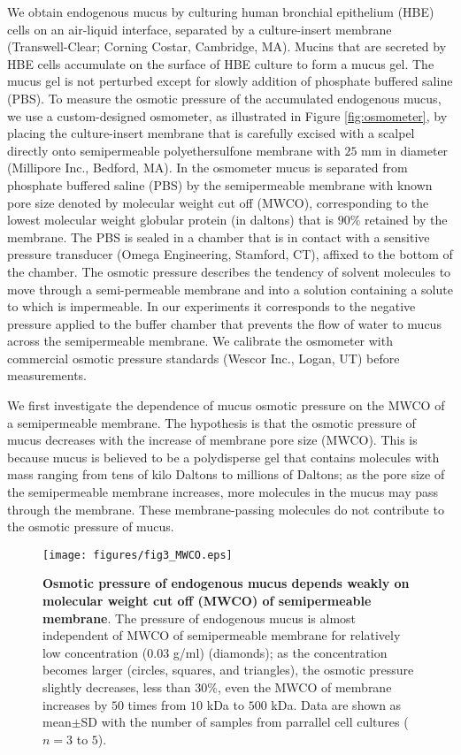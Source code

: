 \documentclass[8.5pt,twoside,twocolumn]{article}
\begin{document}
We obtain endogenous mucus by culturing human bronchial epithelium (HBE)
cells on an air-liquid interface\cite{Fulcher2005}, separated by a
culture-insert membrane (Transwell-Clear; Corning Costar, Cambridge, MA).
Mucins that are secreted by HBE cells accumulate on the surface of HBE
culture to form a mucus gel. The mucus gel is not perturbed except for
slowly addition of phosphate buffered saline (PBS). To measure the osmotic
pressure of the accumulated endogenous mucus, we use a custom-designed
osmometer, as illustrated in Figure \ref{fig:osmometer}, by placing the
culture-insert membrane that is carefully excised with a scalpel directly
onto semipermeable polyethersulfone membrane with $25$ mm in diameter
(Millipore Inc., Bedford, MA). In the osmometer mucus is separated from
phosphate buffered saline (PBS) by the semipermeable membrane with known
pore size denoted by molecular weight cut off (MWCO), corresponding to the
lowest molecular weight globular protein (in daltons) that is $90\%$
retained by the membrane. The PBS is sealed in a chamber that is in contact
with a sensitive pressure transducer (Omega Engineering, Stamford, CT),
affixed to the bottom of the chamber. The osmotic pressure describes the
tendency of solvent molecules to move through a semi-permeable membrane and
into a solution containing a solute to which is impermeable. In our
experiments it corresponds to the negative pressure applied to the buffer
chamber that prevents the flow of water to mucus across the semipermeable
membrane. We calibrate the osmometer with commercial osmotic pressure
standards (Wescor Inc., Logan, UT) before measurements.

We first investigate the dependence of mucus osmotic pressure on the MWCO of
a semipermeable membrane. The hypothesis is that the osmotic pressure of
mucus decreases with the increase of membrane pore size (MWCO). This is
because mucus is believed to be a polydisperse gel that contains molecules
with mass ranging from tens of kilo Daltons to millions of Daltons; as the
pore size of the semipermeable membrane increases, more molecules in the
mucus may pass through the membrane. These membrane-passing molecules do not
contribute to the osmotic pressure of mucus. 
\begin{figure}[h]
\centering
\texttt{[image: figures/fig3\_MWCO.eps]}
\caption{\textbf{Osmotic pressure of endogenous mucus depends weakly on
molecular weight cut off (MWCO) of semipermeable membrane}. The pressure of
endogenous mucus is almost independent of MWCO of semipermeable membrane for
relatively low concentration ($0.03$ g/ml) (diamonds); as the concentration
becomes larger (circles, squares, and triangles), the osmotic pressure
slightly decreases, less than $30\%$, even the MWCO of membrane increases by 
$50$ times from $10$ kDa to $500$ kDa. Data are shown as mean$\pm $SD with
the number of samples from parrallel cell cultures ($n=3$ to $5$). }
\label{fig:MWCO}
\end{figure}
\end{document}
